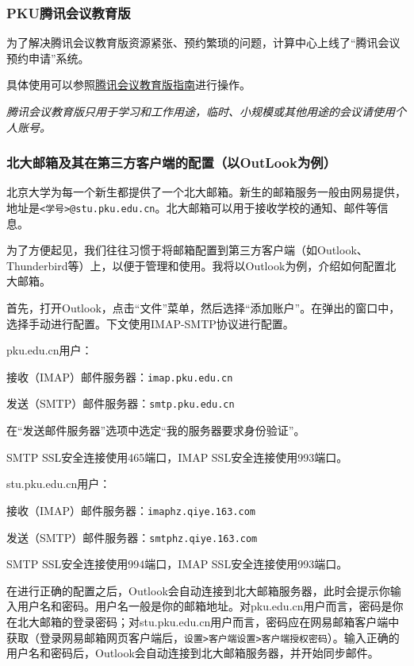 \documentclass[../main.tex]{subfiles}
\begin{document}
\subsubsection{PKU腾讯会议教育版}

为了解决腾讯会议教育版资源紧张、预约繁琐的问题，计算中心上线了“腾讯会议预约申请”系统。

具体使用可以参照\href{https://its.pku.edu.cn/service_1_webex.jsp}{腾讯会议教育版指南}进行操作。

\emph{腾讯会议教育版只用于学习和工作用途，临时、小规模或其他用途的会议请使用个人账号。}

\subsubsection{北大邮箱及其在第三方客户端的配置（以OutLook为例）}

北京大学为每一个新生都提供了一个北大邮箱。新生的邮箱服务一般由网易提供，地址是\texttt{<学号>@stu.pku.edu.cn}。北大邮箱可以用于接收学校的通知、邮件等信息。

为了方便起见，我们往往习惯于将邮箱配置到第三方客户端（如Outlook、Thunderbird等）上，以便于管理和使用。我将以Outlook为例，介绍如何配置北大邮箱。

首先，打开Outlook，点击“文件”菜单，然后选择“添加账户”。在弹出的窗口中，选择手动进行配置。下文使用IMAP-SMTP协议进行配置。

pku.edu.cn用户：

    接收（IMAP）邮件服务器：\texttt{imap.pku.edu.cn}

    发送（SMTP）邮件服务器：\texttt{smtp.pku.edu.cn}

    在“发送邮件服务器”选项中选定“我的服务器要求身份验证”。

SMTP SSL安全连接使用465端口，IMAP SSL安全连接使用993端口。

stu.pku.edu.cn用户：

    接收（IMAP）邮件服务器：\texttt{imaphz.qiye.163.com}

    发送（SMTP）邮件服务器：\texttt{smtphz.qiye.163.com}

SMTP SSL安全连接使用994端口，IMAP SSL安全连接使用993端口。

在进行正确的配置之后，Outlook会自动连接到北大邮箱服务器，此时会提示你输入用户名和密码。用户名一般是你的邮箱地址。对pku.edu.cn用户而言，密码是你在北大邮箱的登录密码；对stu.pku.edu.cn用户而言，密码应在网易邮箱客户端中获取（登录网易邮箱网页客户端后，\texttt{设置>客户端设置>客户端授权密码}）。输入正确的用户名和密码后，Outlook会自动连接到北大邮箱服务器，并开始同步邮件。
\end{document}
